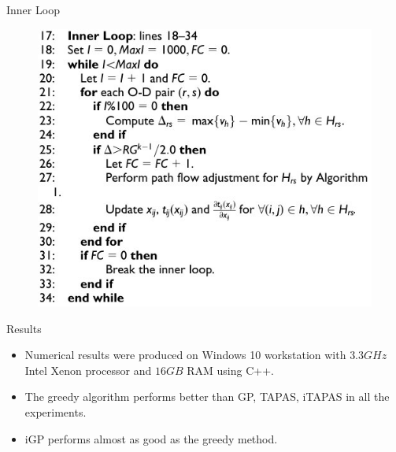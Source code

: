 \documentclass{beamer}
\begin{document}
\begin{frame}{Inner Loop}
    \begin{figure}
    \includegraphics[scale=0.5]{./alg23.jpg}
    \end{figure}
\end{frame}



\begin{frame}{Results}
\begin{itemize}
    \item Numerical results were produced on Windows 10
    workstation with $3.3GHz$ Intel Xenon processor and
    $16 GB$ RAM using C++.

    \item The greedy algorithm performs better than GP, TAPAS,
    iTAPAS in all the experiments.

    \item iGP performs almost as good as the greedy method.
\end{itemize}
\end{frame}
\end{document}

